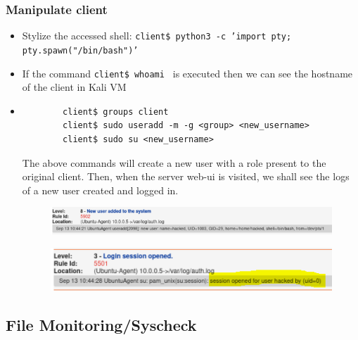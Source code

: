 \documentclass{article}
\begin{document}
\subsubsection{Manipulate client}
\begin{itemize}
    \item Stylize the accessed shell: \texttt{client\$ python3 -c 'import pty; pty.spawn("/bin/bash")'}
    \item If the command \texttt{client\$ whoami } is executed then we can see the hostname of the client in Kali VM
    \item 
    {
    \color{blue}%
    \begin{verbatim}
        client$ groups client
        client$ sudo useradd -m -g <group> <new_username>
        client$ sudo su <new_username>
    \end{verbatim}
    }
    The above commands will create a new user with a role present to the original client. Then, when the server web-ui is visited, we shall see the logs of a new user created and logged in.
    \begin{figure}[hbt!]
        \centering
        \includegraphics[scale=0.4]{img-useradd.PNG}
    \end{figure}
    \begin{figure}[hbt!]
        \centering
        \includegraphics[scale=0.4]{img-userlogin.PNG}
    \end{figure}
\end{itemize}
\vspace{1cm}

\subsection{File Monitoring/Syscheck}
\end{document}
